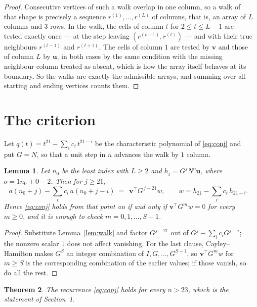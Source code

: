 \documentclass[11pt,a4paper]{article}
\theoremstyle{plain}
\newtheorem{theorem}{Theorem}
\newtheorem{lemma}[theorem]{Lemma}
\theoremstyle{definition}
\begin{document}
\begin{proof}
Consecutive vertices of such a walk overlap in one column, so a walk of that shape is
precisely a sequence $r^{(1)},\dots,r^{(L)}$ of columns, that is, an array of $L$ columns
and $3$ rows. In the walk, the cells of column $t$ for $2\le t\le L-1$ are tested
exactly once --- at the step leaving $(r^{(t-1)},r^{(t)})$ --- and with their true
neighbours $r^{(t-1)}$ and $r^{(t+1)}$. The cells of column $1$ are tested by
$\mathbf{v}$ and those of column $L$ by $\mathbf{u}$, in both cases by the same condition
with the missing neighbour column treated as absent, which is how the array itself behaves at
its boundary. So the walks are exactly the admissible arrays, and summing over all starting
and ending vertices counts them.
\end{proof}

\section{The criterion}

Let $q(t)=t^{21}-\sum_i c_i\,t^{21-i}$ be the characteristic polynomial of
\eqref{eq:conj} and put $G=N$, so that a unit step in $n$ advances the walk by
$1$ column.

\begin{lemma}\label{lem:crit}
Let $n_0$ be the least index with $L\ge2$ and $h_j=G^{j}N^{o}\mathbf{u}$, where
$o=1n_0+0-2$. Then for $j\ge21$,
\[
a(n_0+j)-\sum_i c_i\,a(n_0+j-i)\;=\;\,\mathbf{v}^{\!\top}G^{\,j-21}w,
\qquad w=h_{21}-\sum_i c_i\,h_{21-i} .
\]
Hence \eqref{eq:conj} holds from that point on if and only if
$\mathbf{v}^{\!\top}G^{m}w=0$ for every $m\ge0$, and it is enough to check
$m=0,1,\dots,S-1$.
\end{lemma}

\begin{proof}
Substitute Lemma~\ref{lem:walk} and factor $G^{j-21}$ out of
$G^{j}-\sum_ic_iG^{j-i}$; the nonzero scalar $1$ does not affect
vanishing. For the last clause, Cayley--Hamilton makes $G^{S}$ an integer combination of
$I,G,\dots,G^{S-1}$, so $\mathbf{v}^{\!\top}G^{m}w$ for $m\ge S$ is the corresponding
combination of the earlier values; if those vanish, so do all the rest.
\end{proof}

\begin{theorem}
The recurrence \eqref{eq:conj} holds for every $n>23$, which is the statement of
Section~1.
\end{theorem}
\end{document}
